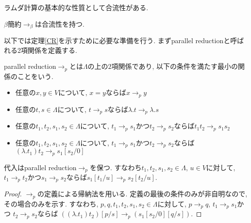 \documentclass{ltjsarticle}
\begin{document}
ラムダ計算の基本的な性質として合流性がある.

\begin{thm}\label{CR}
 $\beta$簡約$\rightarrow_{\beta}$は合流性を持つ.
\end{thm}

以下では定理\ref{CR}を示すために必要な準備を行う. まずparallel reductionと呼ばれる2項関係を定義する.

\begin{defn}
 parallel reduction$\rightarrow_{p}$とは$\Lambda$の上の$2$項関係であり, 以下の条件を満たす最小の関係のことをいう.
 \begin{itemize}
  \item 任意の$x, y \in V$について, $x = y$ならば$x \rightarrow_{p} y$
  \item 任意の$t, s \in \Lambda$について, $t \rightarrow_{p} s$ならば$\lambda. t \rightarrow_{p} \lambda. s$
  \item 任意の$t_1, t_2, s_1, s_2 \in \Lambda$について,
        $t_1 \rightarrow_{p} s_1$かつ$t_2 \rightarrow_{p} s_2$ならば$t_1 t_2 \rightarrow_{p} s_1 s_2$
  \item 任意の$t_1, t_2, s_1, s_2 \in \Lambda$について,
        $t_1 \rightarrow_{p} s_1$かつ$t_2 \rightarrow_{p} s_2$ならば$(\lambda. t_1) t_2 \rightarrow_{p} s_1[s_2/0]$
 \end{itemize}
\end{defn}

\begin{lem}
 代入はparallel reduction$\rightarrow_{p}$を保つ. すなわち$t_1, t_2, s_1, s_2 \in \Lambda$, $u \in V$に対して, $t_1 \rightarrow_{p} t_2$かつ$s_1 \rightarrow_{p} s_2$ならば$s_1[t_1/u] \rightarrow_{p} s_2[t_2/u]$.
\end{lem}

\begin{proof}
 $\rightarrow_{p}$の定義による帰納法を用いる. 定義の最後の条件のみが非自明なので, その場合のみを示す.
 すなわち, $p, q, t_1, t_2, s_1, s_2 \in \Lambda$に対して,
$p \rightarrow_{p} q$, $t_1 \rightarrow_{p} s_1$かつ $t_2 \rightarrow_{p} s_2$ならば
  $((\lambda. t_1) t_2) [p / s] \rightarrow_{p} (s_1 [s_2 / 0] [q / s])$.
 
\end{proof}
\end{document}
